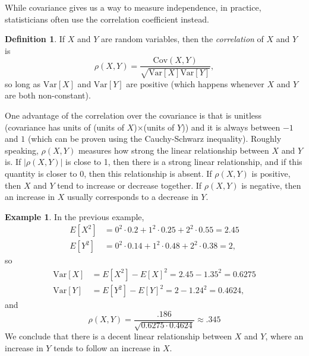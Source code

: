 \documentclass[12pt]{article}
\theoremstyle{plain}
\theoremstyle{definition}
\newtheorem{definition}[theorem]{Definition}
\newtheorem{example}[theorem]{Example}
\theoremstyle{remark}
\newcommand{\Var}{\ensuremath{\textrm{Var}}}
\newcommand{\Cov}{\ensuremath{\textrm{Cov}}}
\begin{document}
While covariance gives us a way to measure independence, in practice, statisticians often use the correlation coefficient instead.
\begin{definition}
    If $X$ and $Y$ are random variables, then the \emph{correlation} of $X$ and $Y$ is
    \[
        \rho(X, Y) = \frac{\Cov(X,Y)}{\sqrt{\Var[X]\Var[Y]}},
    \]
    so long as $\Var[X]$ and $\Var[Y]$ are positive (which happens whenever $X$ and $Y$ are both non-constant).
\end{definition}
One advantage of the correlation over the covariance is that is unitless (covariance has units of (units of $X$)$\times$(units of $Y$)) and it is always between $-1$ and $1$ (which can be proven using the Cauchy-Schwarz inequality).
Roughly speaking, $\rho(X,Y)$ measures how strong the linear relationship between $X$ and $Y$ is.
If $|\rho(X,Y)|$ is close to 1, then there is a strong linear relationship, and if this quantity is closer to 0, then this relationship is absent.
If $\rho(X,Y)$ is positive, then $X$ and $Y$ tend to increase or decrease together.
If $\rho(X,Y)$ is negative, then an increase in $X$ usually corresponds to a decrease in $Y$.
\begin{example}
    In the previous example,
    \begin{align*}
        E[X^2] &= 0^2\cdot 0.2 + 1^2\cdot 0.25 + 2^2\cdot 0.55 = 2.45\\
        E[Y^2] &= 0^2\cdot 0.14 + 1^2\cdot 0.48 + 2^2\cdot 0.38 = 2,
    \end{align*}
    so
    \begin{align*}
        \Var[X] &= E[X^2]-E[X]^2 = 2.45 - 1.35^2 = 0.6275\\
        \Var[Y] &= E[Y^2]-E[Y]^2 = 2 - 1.24^2 = 0.4624,
    \end{align*}
    and
    \[
        \rho(X,Y) = \frac{.186}{\sqrt{0.6275\cdot 0.4624}} \approx .345
    \]
    We conclude that there is a decent linear relationship between $X$ and $Y$, where an increase in $Y$ tends to follow an increase in $X$.
\end{example}
\end{document}
